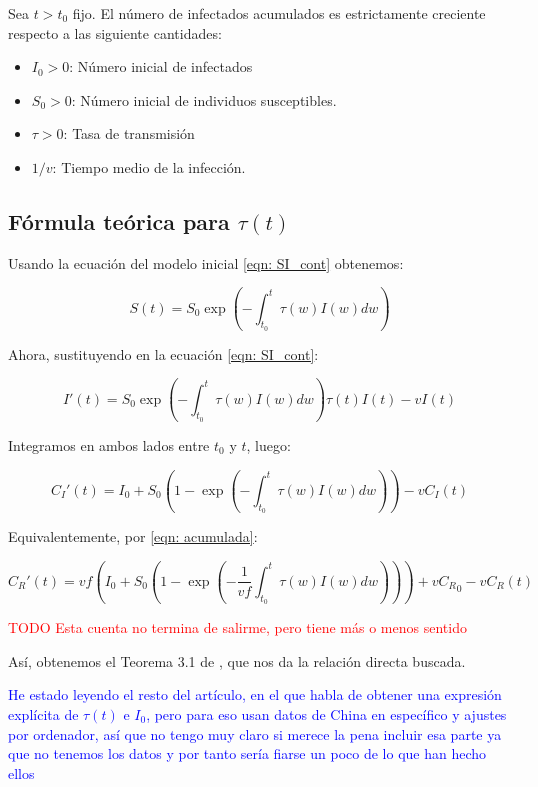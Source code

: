 \begin{theorem}
Sea $t>t_0$ fijo. El número de infectados acumulados es estrictamente creciente respecto a las siguiente cantidades:
\begin{itemize}
\item $I_0>0$: Número inicial de infectados
\item $S_0>0$: Número inicial de individuos susceptibles.
\item $\tau>0$: Tasa de transmisión
\item $1/v$: Tiempo medio de la infección.
\end{itemize}
\end{theorem}

\subsection{Fórmula teórica para $\tau (t)$}

Usando la ecuación del modelo inicial \eqref{eqn: SI_cont} obtenemos:

$$S(t) = S_0 \exp{\left( - \int_{t_0}^t \tau(w) I(w) dw \right) } $$ 

Ahora, sustituyendo en la ecuación \eqref{eqn: SI_cont}:

$$I'(t) = S_0 \exp{\left( - \int_{t_0}^t \tau(w) I(w) dw \right) } \tau (t) I(t) -vI(t) $$

Integramos en ambos lados entre $t_0$ y $t$, luego:

$$ C_I'(t) = I_0 + S_0 \left( 1-\exp{\left(- \int_{t_0}^t \tau (w) I(w)dw \right)}\right) -vC_I(t)$$

Equivalentemente, por \eqref{eqn: acumulada}:

$$C_R'(t) = vf\left( I_0 + S_0 \left( 1-\exp{\left(- \frac{1}{vf}\int_{t_0}^t \tau (w ) I(w)dw \right)}\right)\right) +v{C_R}_0 -vC_R(t)$$

\textcolor{red}{TODO Esta cuenta no termina de salirme, pero tiene más o menos sentido}

Así, obtenemos el Teorema 3.1 de \cite{demongeotSIEpidemicModel}, que nos da la relación directa buscada.

\textcolor{blue}{He estado leyendo el resto del artículo, en el que habla de obtener una expresión explícita de $\tau (t)$ e $I_0$, pero para eso usan datos de China en específico y ajustes por ordenador, así que no tengo muy claro si merece la pena incluir esa parte ya que no tenemos los datos y por tanto sería fiarse un poco de lo que han hecho ellos}







